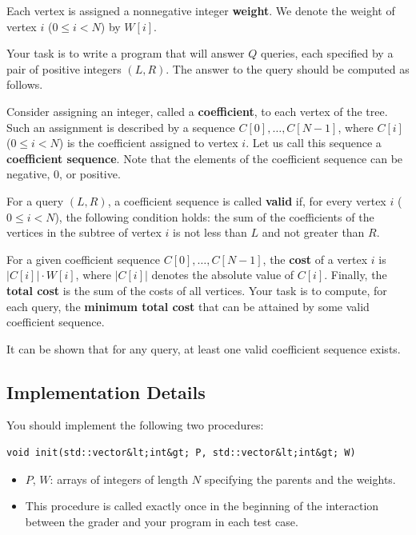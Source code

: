 Each vertex is assigned a nonnegative integer \textbf{weight}. We denote
the weight of vertex \(i\) (\(0 \leq i < N\)) by \(W[i]\).

Your task is to write a program that will answer \(Q\) queries, each
specified by a pair of positive integers \((L, R)\). The answer to the
query should be computed as follows.

Consider assigning an integer, called a \textbf{coefficient}, to each
vertex of the tree. Such an assignment is described by a sequence
\(C[0], \ldots, C[N-1]\), where \(C[i]\) (\(0 \leq i < N\)) is the
coefficient assigned to vertex \(i\). Let us call this sequence a
\textbf{coefficient sequence}. Note that the elements of the coefficient
sequence can be negative, \(0\), or positive.

For a query \((L, R)\), a coefficient sequence is called \textbf{valid}
if, for every vertex \(i\) (\(0 \leq i < N\)), the following condition
holds: the sum of the coefficients of the vertices in the subtree of
vertex \(i\) is not less than \(L\) and not greater than \(R\).

For a given coefficient sequence \(C[0], \ldots, C[N-1]\), the
\textbf{cost} of a vertex \(i\) is \(|C[i]| \cdot W[i]\), where
\(|C[i]|\) denotes the absolute value of \(C[i]\). Finally, the
\textbf{total cost} is the sum of the costs of all vertices. Your task
is to compute, for each query, the \textbf{minimum total cost} that can
be attained by some valid coefficient sequence.

It can be shown that for any query, at least one valid coefficient
sequence exists.

\hypertarget{implementation-details}{%
\subsection{Implementation Details}\label{implementation-details}}

You should implement the following two procedures:

\begin{verbatim}
void init(std::vector&lt;int&gt; P, std::vector&lt;int&gt; W)
\end{verbatim}

\begin{itemize}
\tightlist
\item
  \(P\), \(W\): arrays of integers of length \(N\) specifying the
  parents and the weights.
\item
  This procedure is called exactly once in the beginning of the
  interaction between the grader and your program in each test case.
\end{itemize}

